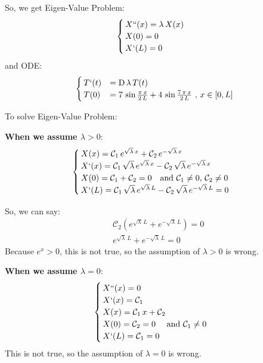 \documentclass[../main.tex]{subfiles}
\begin{document}
So, we get Eigen-Value Problem:
\begin{align}
    \begin{cases} \label{eq:A2_16}
        \, X``(x) = \lambda \, X(x) \\
        \, X(0) = 0 \\
        \, X`(L) = 0
    \end{cases}
\end{align}
and ODE:
\begin{align}
    \begin{cases} \label{eq:A2_17}
        \, T`(t) &= \mathrm{D} \, \lambda \, T(t) \\
        \, T(0) &= 7 \, \sin{\frac{\pi \, x}{2 \, L}} + 4 \, \sin{\frac{7 \, \pi \, x}{2 \, L}} \text{ ,  } x \in [0,L]
    \end{cases}
\end{align}

To solve Eigen-Value Problem:

\textbf{When we assume $\lambda > 0$}:
\begin{align}
    \begin{cases} \label{eq:A2_18}
        \, X(x) = \mathcal{C}_1 \, e^{\sqrt{\lambda} \, x} + \mathcal{C}_2 \, e^{- \sqrt{\lambda} \, x} \\
        \, X`(x) = \mathcal{C}_1 \, \sqrt{\lambda} \, e^{\sqrt{\lambda} \, x} - \mathcal{C}_2 \, \sqrt{\lambda} \, e^{- \sqrt{\lambda} \, x} \\
        \, X(0) = \mathcal{C}_1 + \mathcal{C}_2 = 0 \quad \text{and } \mathcal{C}_1 \neq 0 \text{, } \mathcal{C}_2 \neq 0 \\
        \, X`(L) = \mathcal{C}_1 \, \sqrt{\lambda} \, e^{\sqrt{\lambda} \, L} - \mathcal{C}_2 \, \sqrt{\lambda} \, e^{- \sqrt{\lambda} \, L} = 0
    \end{cases}
\end{align}

So, we can say:
\begin{align}
    & \mathcal{C}_2 (e^{\sqrt{\lambda} \, L} + e^{- \sqrt{\lambda} \, L}) = 0 \\
    & e^{\sqrt{\lambda} \, L} + e^{- \sqrt{\lambda} \, L} = 0 \nonumber
\end{align}
Because $e^x > 0$, this is not true, so the assumption of $\lambda > 0$ is wrong.

\textbf{When we assume $\lambda = 0$}:
\begin{align}
    \begin{cases} \label{eq:A2_9}
        \, X``(x) = 0 \\
        \, X`(x) = \mathcal{C}_1 \\
        \, X(x) = \mathcal{C}_1 \, x + \mathcal{C}_2 \\
        \, X(0) = \mathcal{C}_2 = 0 \quad \text{ and  }\mathcal{C}_1 \neq 0 \\
        \, X`(L) = \mathcal{C}_1 = 0
    \end{cases}
\end{align}
This is not true, so the assumption of $\lambda = 0$ is wrong.
\end{document}
